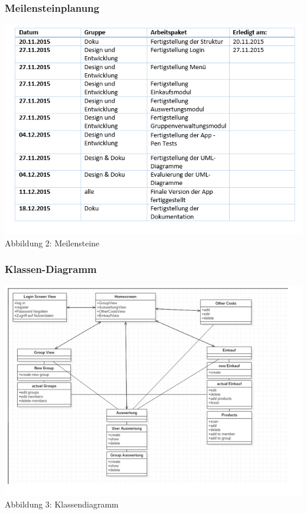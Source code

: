 \documentclass[12pt,a4paper]{article}
\begin{document}
\subsubsection*{Meilensteinplanung}
\includegraphics[scale=0.6, origin=l]{Meilensteine.png}
\\
\footnotesize Abbildung 2: Meilensteine
\normalsize
\\
\linebreak
\subsubsection*{Klassen-Diagramm}
\includegraphics[scale=0.6, origin=l]{Klassendiagramm.png}
\\
\footnotesize Abbildung 3: Klassendiagramm
\normalsize
\\
\linebreak
\end{document}

